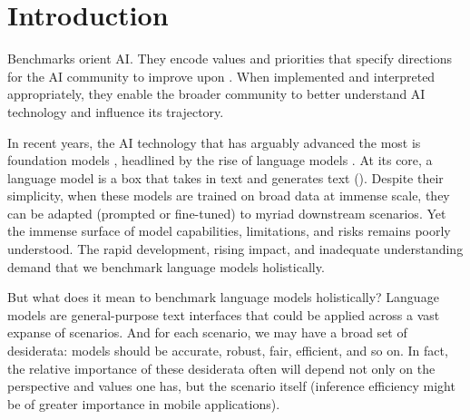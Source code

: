 \hypertarget{introduction}{\section{Introduction}}
\label{sec:introduction}

Benchmarks orient AI.
They encode values and priorities \citep{ethayarajh2020utility, birhane2022values} that specify directions for the 
AI community to improve upon \citep{jones1995evaluating, jones2005acl, kiela2021dynabench, bowman2021fix,  raji2021benchmark}.
When implemented and interpreted appropriately, they enable the broader community to better understand AI technology and influence its trajectory.

In recent years, the AI technology that has arguably advanced the most is foundation models \citep{bommasani2021opportunities}, headlined by the rise of language models \citep[LMs;][]{peters2018elmo, devlin2019bert,brown2020gpt3,rae2021gopher,chowdhery2022palm}.
At its core, a language model is a box that takes in text and generates text ().
Despite their simplicity,
when these models are trained on broad data
at immense scale, they can be adapted (\eg prompted or fine-tuned) to myriad downstream scenarios.
Yet the immense surface of model capabilities, limitations, and risks remains poorly understood.
The rapid development, rising impact, and inadequate understanding demand that we benchmark language models holistically.


But what does it mean to benchmark language models holistically?
Language models are general-purpose text interfaces that could be applied across a vast expanse of scenarios.
And for each scenario, we may have a broad set of desiderata: models should be accurate, robust, fair, efficient, and so on.
In fact, the relative importance of these desiderata often will depend not only on the perspective and values one has, but the scenario itself (\eg inference efficiency might be of greater importance in mobile applications).

